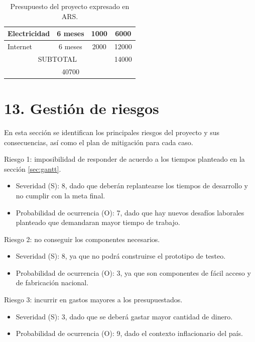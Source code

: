 \documentclass[
11pt, %
]{charter}
\begin{document}
\begin{table}[htpb]
\begin{tabularx}{\linewidth}{@{}|X|c|r|r|@{}}
 Electricidad&
  \multicolumn{1}{c|}{6 meses} &
  \multicolumn{1}{c|}{1000} &
  \multicolumn{1}{c|}{6000} \\ \hline
 Internet&
  \multicolumn{1}{c|}{6 meses} &
  \multicolumn{1}{c|}{2000} &
  \multicolumn{1}{c|}{12000} \\ \hline
\multicolumn{3}{|c|}{SUBTOTAL} &
  \multicolumn{1}{c|}{14000} \\ \hline
\rowcolor[HTML]{C0C0C0}
\multicolumn{3}{|c|}{TOTAL} & 40700
   \\ \hline
\end{tabularx}%
\caption{Presupuesto del proyecto expresado en ARS.}
\label{tab:presupuesto}
\end{table}


\section{13. Gestión de riesgos}
\label{sec:riesgos}

En esta sección se identifican los principales riesgos del proyecto y sus consecuencias, así como el plan de mitigación para cada caso.

Riesgo 1: imposibilidad de responder de acuerdo a los tiempos planteado en la sección \ref{sec:gantt}.
\begin{itemize}
	\item Severidad (S): 8, dado que deberán replantearse los tiempos de desarrollo y no cumplir con la meta final.
	\item Probabilidad de ocurrencia (O): 7, dado que hay nuevos desafíos laborales planteado que demandaran mayor tiempo de trabajo. 
\end{itemize}

Riesgo 2: no conseguir los componentes necesarios.
\begin{itemize}
	\item Severidad (S): 8, ya que no podrá construirse el prototipo de testeo.
	\item Probabilidad de ocurrencia (O): 3, ya que son componentes de fácil acceso y de fabricación nacional. 
\end{itemize}

Riesgo 3: incurrir en gastos mayores a los presupuestados.
\begin{itemize}
	\item Severidad (S): 3, dado que se deberá gastar mayor cantidad de dinero.
	\item Probabilidad de ocurrencia (O): 9, dado el contexto inflacionario del país. 
\end{itemize}
\end{document}
